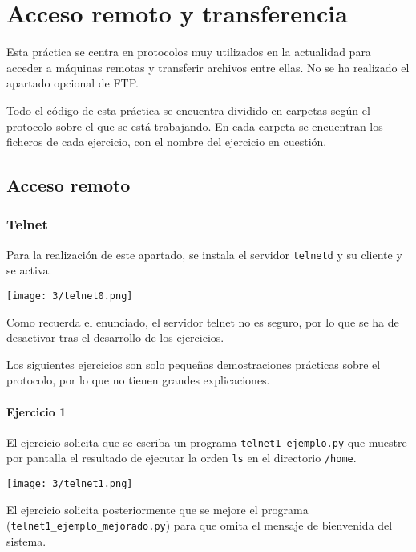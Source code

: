 \chapter{Acceso remoto y transferencia}\label{chap:3}
Esta práctica se centra en protocolos muy utilizados en la actualidad para
acceder a máquinas remotas y transferir archivos entre ellas. No se ha
realizado el apartado opcional de FTP{.}

Todo el código de esta práctica se encuentra dividido en carpetas según
el protocolo sobre el que se está trabajando. En cada carpeta se encuentran
los ficheros de cada ejercicio, con el nombre del ejercicio en cuestión.

\section{Acceso remoto}
\subsection{Telnet}
Para la realización de este apartado, se instala el servidor \Verb#telnetd# y su cliente y
se activa.

\begin{minipage}{\linewidth}
    \centering
    \texttt{[image: 3/telnet0.png]}
    \label{fig:3/1}
\end{minipage}

Como recuerda el enunciado, el servidor telnet no es seguro, por lo que se ha de desactivar
tras el desarrollo de los ejercicios.

Los siguientes ejercicios son solo pequeñas demostraciones prácticas sobre el protocolo, por
lo que no tienen grandes explicaciones.

\subsubsection{Ejercicio 1}
El ejercicio solicita que se escriba un programa \lstinline{telnet1_ejemplo.py}
que muestre por pantalla el resultado de ejecutar la orden \lstinline{ls} en el
directorio \Verb#/home#.

\begin{minipage}{\linewidth}
    \centering
    \texttt{[image: 3/telnet1.png]}
    \label{fig:3/2}
\end{minipage}

El ejercicio solicita posteriormente que se mejore el programa \\
(\Verb#telnet1_ejemplo_mejorado.py#) para que omita el mensaje de bienvenida
del sistema.

